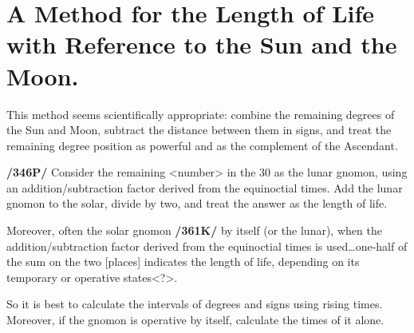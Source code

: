\section{A Method for the Length of Life with Reference to the Sun and the Moon.}

This method seems scientifically appropriate: combine the remaining degrees of the Sun and Moon, subtract the distance between them in signs, and treat the remaining degree position as powerful and as the
complement of the Ascendant. 

\textbf{/346P/} Consider the remaining <number> in the 30 as the lunar gnomon, using an addition/subtraction factor derived from the equinoctial times. Add the lunar gnomon to the solar, divide by two, and treat the answer as the length of life. 

Moreover, often the solar gnomon \textbf{/361K/} by itself (or the lunar), when the addition/subtraction factor derived from the equinoctial times is used…one-half of the sum on the two [places] indicates the length of life, depending on its temporary or operative states<?>.

So it is best to calculate the intervals of degrees and signs using rising times. Moreover, if the gnomon is operative by itself, calculate the times of it alone.

\newpage